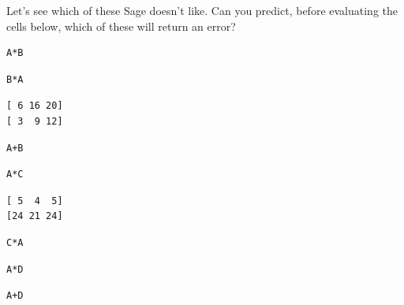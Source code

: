 \documentclass[10pt,]{book}
\theoremstyle{plain}
\numberwithin{equation}{section}
\begin{document}
      Let's see which of these Sage doesn't like. Can you predict, before
      evaluating the cells below, which of these will return an error?
\begin{lstlisting}[style=sageinput]
A*B
\end{lstlisting}
\begin{lstlisting}[style=sageinput]
B*A
\end{lstlisting}
\begin{lstlisting}[style=sageoutput]
[ 6 16 20]
[ 3  9 12]
\end{lstlisting}
\begin{lstlisting}[style=sageinput]
A+B
\end{lstlisting}
\begin{lstlisting}[style=sageinput]
A*C
\end{lstlisting}
\begin{lstlisting}[style=sageoutput]
[ 5  4  5]
[24 21 24]
\end{lstlisting}
\begin{lstlisting}[style=sageinput]
C*A
\end{lstlisting}
\begin{lstlisting}[style=sageinput]
A*D
\end{lstlisting}
\begin{lstlisting}[style=sageinput]
A+D
\end{lstlisting}
\typeout{************************************************}
\typeout{************************************************}
\end{document}
